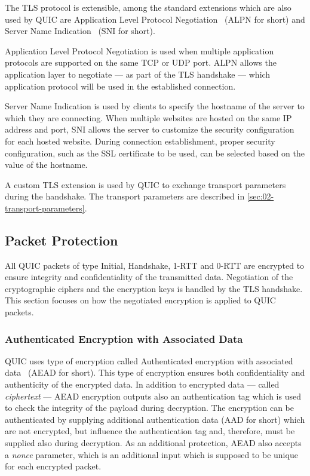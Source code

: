 The TLS protocol is extensible, among the standard extensions which are also used by QUIC are
Application Level Protocol Negotiation~\cite{rfc7301} (ALPN for short) and Server Name
Indication~\cite{rfc6066} (SNI for short).

Application Level Protocol Negotiation is used when multiple application protocols are supported on
the same TCP or UDP port. ALPN allows the application layer to negotiate --- as part of the TLS
handshake --- which application protocol will be used in the established connection.

Server Name Indication is used by clients to specify the hostname of the server to which they are
connecting. When multiple websites are hosted on the same IP address and port, SNI allows the server
to customize the security configuration for each hosted website. During connection establishment,
proper security configuration, such as the SSL certificate to be used, can be selected based on the
value of the hostname.

A custom TLS extension is used by QUIC to exchange transport parameters during the handshake. The
transport parameters are described in \autoref{sec:02-transport-parameters}.

\subsection{Packet Protection}\label{sec:02-packet-protection}

All QUIC packets of type Initial, Handshake, 1-RTT and 0-RTT are encrypted to ensure integrity and
confidentiality of the transmitted data. Negotiation of the cryptographic ciphers and the encryption
keys is handled by the TLS handshake. This section focuses on how the negotiated encryption is
applied to QUIC packets.

\subsubsection{Authenticated Encryption with Associated Data}

QUIC uses type of encryption called Authenticated encryption with associated data~\cite{rfc5116}
(AEAD for short). This type of encryption ensures both confidentiality and authenticity of the
encrypted data. In addition to encrypted data --- called \textit{ciphertext} --- AEAD encryption
outputs also an authentication tag which is used to check the integrity of the payload during
decryption. The encryption can be authenticated by supplying additional authentication data (AAD for
short) which are not encrypted, but influence the authentication tag and, therefore, must be
supplied also during decryption. As an additional protection, AEAD also accepts a \textit{nonce}
parameter, which is an additional input which is supposed to be unique for each encrypted packet.

